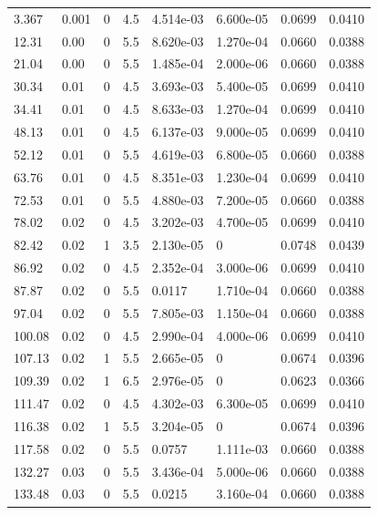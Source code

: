 \documentclass[preview]{standalone}
\begin{document}
{{\begin{tabular}{L{1.2cm}C{1.2cm} C{0.3cm}C{0.5cm} C{1.4cm}C{1.4cm} C{1.4cm}C{1.4cm}}
  3.367  &  0.001  & 0     & 4.5 &  4.514e-03  & 6.600e-05  & 0.0699 &  0.0410   \\ 
  12.31  &  0.00  & 0     & 5.5 &  8.620e-03  & 1.270e-04  & 0.0660 &  0.0388   \\ 
  21.04  &  0.00  & 0     & 5.5 &  1.485e-04  & 2.000e-06  & 0.0660 &  0.0388   \\ 
  30.34  &  0.01  & 0     & 4.5 &  3.693e-03  & 5.400e-05  & 0.0699 &  0.0410   \\ 
  34.41  &  0.01  & 0     & 4.5 &  8.633e-03  & 1.270e-04  & 0.0699 &  0.0410   \\ 
  48.13  &  0.01  & 0     & 4.5 &  6.137e-03  & 9.000e-05  & 0.0699 &  0.0410   \\ 
  52.12  &  0.01  & 0     & 5.5 &  4.619e-03  & 6.800e-05  & 0.0660 &  0.0388   \\ 
  63.76  &  0.01  & 0     & 4.5 &  8.351e-03  & 1.230e-04  & 0.0699 &  0.0410   \\ 
  72.53  &  0.01  & 0     & 5.5 &  4.880e-03  & 7.200e-05  & 0.0660 &  0.0388   \\ 
  78.02  &  0.02  & 0     & 4.5 &  3.202e-03  & 4.700e-05  & 0.0699 &  0.0410   \\ 
  82.42  &  0.02  & 1     & 3.5 &  2.130e-05  & 0  & 0.0748 &  0.0439   \\ 
  86.92  &  0.02  & 0     & 4.5 &  2.352e-04  & 3.000e-06  & 0.0699 &  0.0410   \\ 
  87.87  &  0.02  & 0     & 5.5 &  0.0117  & 1.710e-04  & 0.0660 &  0.0388   \\ 
  97.04  &  0.02  & 0     & 5.5 &  7.805e-03  & 1.150e-04  & 0.0660 &  0.0388   \\ 
  100.08  &  0.02  & 0     & 4.5 &  2.990e-04  & 4.000e-06  & 0.0699 &  0.0410   \\ 
  107.13  &  0.02  & 1     & 5.5 &  2.665e-05  & 0  & 0.0674 &  0.0396   \\ 
  109.39  &  0.02  & 1     & 6.5 &  2.976e-05  & 0  & 0.0623 &  0.0366   \\ 
  111.47  &  0.02  & 0     & 4.5 &  4.302e-03  & 6.300e-05  & 0.0699 &  0.0410   \\ 
  116.38  &  0.02  & 1     & 5.5 &  3.204e-05  & 0  & 0.0674 &  0.0396   \\ 
  117.58  &  0.02  & 0     & 5.5 &  0.0757  & 1.111e-03  & 0.0660 &  0.0388   \\ 
  132.27  &  0.03  & 0     & 5.5 &  3.436e-04  & 5.000e-06  & 0.0660 &  0.0388   \\ 
  133.48  &  0.03  & 0     & 5.5 &  0.0215  & 3.160e-04  & 0.0660 &  0.0388   \\ 

\end{tabular}}}
\end{document}
